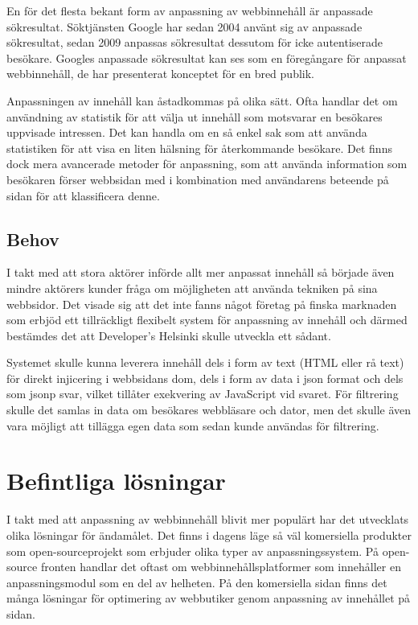 En för det flesta bekant form av anpassning av webbinnehåll är anpassade sökresultat. Söktjänsten Google har sedan 2004 använt sig av anpassade sökresultat, sedan 2009 anpassas sökresultat dessutom för icke autentiserade besökare. \citep{Hannak:2013:MPW:2488388.2488435} Googles anpassade sökresultat kan ses som en föregångare för anpassat webbinnehåll, de har presenterat konceptet för en bred publik.

Anpassningen av innehåll kan åstadkommas på olika sätt. Ofta handlar det om användning av statistik för att välja ut innehåll som motsvarar en besökares uppvisade intressen. Det kan handla om en så enkel sak som att använda statistiken för att visa en liten hälsning för återkommande besökare. Det finns dock mera avancerade metoder för anpassning, som att använda information som besökaren förser webbsidan med i kombination med användarens beteende på sidan för att klassificera denne. \citep{Albanese:2004:WPB:1031453.1031469} 

\subsection{Behov}

I takt med att stora aktörer införde allt mer anpassat innehåll så började även mindre aktörers kunder fråga om möjligheten att använda tekniken på sina webbsidor. Det visade sig att det inte fanns något företag på finska marknaden som erbjöd ett tillräckligt flexibelt system för anpassning av innehåll och därmed bestämdes det att Developer's Helsinki skulle utveckla ett sådant.

Systemet skulle kunna leverera innehåll dels i form av text (HTML eller rå text) för direkt injicering i webbsidans \gls{dom}, dels i form av data i \gls{json} format och dels som \gls{jsonp} svar, vilket tillåter exekvering av JavaScript vid svaret. För filtrering skulle det samlas in data om besökares webbläsare och dator, men det skulle även vara möjligt att tillägga egen data som sedan kunde användas för filtrering.

\section{Befintliga lösningar}

I takt med att anpassning av webbinnehåll blivit mer populärt har det utvecklats olika lösningar för ändamålet. Det finns i dagens läge så väl komersiella produkter som open-sourceprojekt som erbjuder olika typer av anpassningssystem. På open-source fronten handlar det oftast om webbinnehållsplatformer som innehåller en anpassningsmodul som en del av helheten. På den komersiella sidan finns det många lösningar för optimering av webbutiker genom anpassning av innehållet på sidan.

